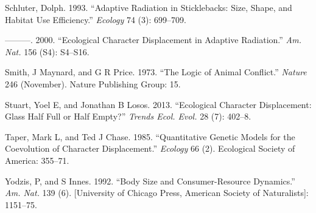 \documentclass[11pt,]{article}
\begin{document}
\hypertarget{ref-Schluter1993}{}
Schluter, Dolph. 1993. ``Adaptive Radiation in Sticklebacks: Size,
Shape, and Habitat Use Efficiency.'' \emph{Ecology} 74 (3): 699--709.

\hypertarget{ref-Schluter2000}{}
---------. 2000. ``Ecological Character Displacement in Adaptive
Radiation.'' \emph{Am. Nat.} 156 (S4): S4--S16.

\hypertarget{ref-Smith1973}{}
Smith, J Maynard, and G R Price. 1973. ``The Logic of Animal Conflict.''
\emph{Nature} 246 (November). Nature Publishing Group: 15.

\hypertarget{ref-Stuart2013}{}
Stuart, Yoel E, and Jonathan B Losos. 2013. ``Ecological Character
Displacement: Glass Half Full or Half Empty?'' \emph{Trends Ecol. Evol.}
28 (7): 402--8.

\hypertarget{ref-Taper1985}{}
Taper, Mark L, and Ted J Chase. 1985. ``Quantitative Genetic Models for
the Coevolution of Character Displacement.'' \emph{Ecology} 66 (2).
Ecological Society of America: 355--71.

\hypertarget{ref-Yodzis1992}{}
Yodzis, P, and S Innes. 1992. ``Body Size and Consumer-Resource
Dynamics.'' \emph{Am. Nat.} 139 (6). {[}University of Chicago Press,
American Society of Naturalists{]}: 1151--75.
\end{document}
